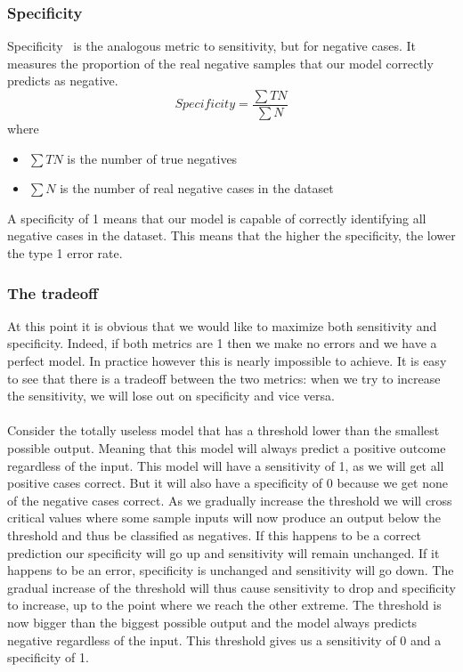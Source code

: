 \subsubsection{Specificity}
Specificity~\cite{wikisensspec} is the analogous metric to sensitivity, but for negative cases. It measures the proportion of the real negative samples that our model correctly predicts as negative.
$$
Specificity = \frac{\sum{TN}}{\sum{N}}
$$
where
\begin{itemize}
\item $\sum{TN}$ is the number of true negatives
\item $\sum{N}$ is the number of real negative cases in the dataset
\end{itemize}
A specificity of 1 means that our model is capable of correctly identifying all negative cases in the dataset. This means that the higher the specificity, the lower the type 1 error rate.
\subsubsection{The tradeoff}
At this point it is obvious that we would like to maximize both sensitivity and specificity. Indeed, if both metrics are 1 then we make no errors and we have a perfect model. In practice however this is nearly impossible to achieve. It is easy to see that there is a tradeoff between the two metrics: when we try to increase the sensitivity, we will lose out on specificity and vice versa. \\ \\ 
Consider the totally useless model that has a threshold lower than the smallest possible output. Meaning that this model will always predict a positive outcome regardless of the input. This model will have a sensitivity of 1, as we will get all positive cases correct. But it will also have a specificity of 0 because we get none of the negative cases correct. As we gradually increase the threshold we will cross critical values where some sample inputs will now produce an output below the threshold and thus be classified as negatives. If this happens to be a correct prediction our specificity will go up and sensitivity will remain unchanged. If it happens to be an error, specificity is unchanged and sensitivity will go down. The gradual increase of the threshold will thus cause sensitivity to drop and specificity to increase, up to the point where we reach the other extreme. The threshold is now bigger than the biggest possible output and the model always predicts negative regardless of the input. This threshold gives us a sensitivity of 0 and a specificity of 1.

